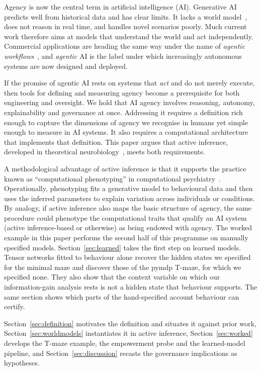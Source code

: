 \documentclass[pdflatex,sn-apa]{sn-jnl}%
\theoremstyle{definition}
\begin{document}
Agency is now the central term in artificial intelligence (AI). Generative AI predicts well from historical data and has clear limits. It lacks a world model~\citep{lecunPathAutonomousMachine2022}, does not reason in real time, and handles novel scenarios poorly. Much current work therefore aims at models that understand the world and act independently. Commercial applications are heading the same way under the name of \emph{agentic workflows}~\citep{ngAgenticDesignPatterns2024}, and \emph{agentic} AI is the label under which increasingly autonomous systems are now designed and deployed.

If the promise of agentic AI rests on systems that \emph{act} and do not merely execute, then tools for defining and measuring agency become a prerequisite for both engineering and oversight. We hold that AI agency involves reasoning, autonomy, explainability and governance at once. Addressing it requires a definition rich enough to capture the dimensions of agency we recognise in humans yet simple enough to measure in AI systems. It also requires a computational architecture that implements that definition. This paper argues that active inference, developed in theoretical neurobiology~\citep{parrActiveInferenceFree2022a}, meets both requirements.

A methodological advantage of active inference is that it supports the practice known as ``computational phenotyping'' in computational psychiatry~\citep{montagueComputationalPsychiatry2012,schwartenbeck2016computational,smithStepByStep2022}. Operationally, phenotyping fits a generative model to behavioural data and then uses the inferred parameters to explain variation across individuals or conditions. By analogy, if active inference also maps the basic structure of agency, the same procedure could phenotype the computational traits that qualify an AI system (active inference-based or otherwise) as being endowed with agency. The worked example in this paper performs the second half of this programme on manually specified models. Section~\ref{sec:learned} takes the first step on learned models. Tensor networks fitted to behaviour alone recover the hidden states we specified for the minimal maze and discover those of the pymdp T-maze, for which we specified none. They also show that the context variable on which our information-gain analysis rests is not a hidden state that behaviour supports. The same section shows which parts of the hand-specified account behaviour can certify.

Section~\ref{sec:definition} motivates the definition and situates it against prior work, Section~\ref{sec:worldmodels} instantiates it in active inference, Section~\ref{sec:worked} develops the T-maze example, the empowerment probe and the learned-model pipeline, and Section~\ref{sec:discussion} recasts the governance implications as hypotheses.
\end{document}
